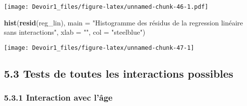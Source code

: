 \documentclass[]{article}
\newenvironment{Shaded}{\begin{snugshade}}{\end{snugshade}}
\newcommand{\KeywordTok}[1]{\textcolor[rgb]{0.13,0.29,0.53}{\textbf{#1}}}
\newcommand{\DataTypeTok}[1]{\textcolor[rgb]{0.13,0.29,0.53}{#1}}
\newcommand{\StringTok}[1]{\textcolor[rgb]{0.31,0.60,0.02}{#1}}
\newcommand{\NormalTok}[1]{#1}
\begin{document}
\texttt{[image: Devoir1\_files/figure-latex/unnamed-chunk-46-1.pdf]}

\begin{Shaded}
\begin{Highlighting}[]
\KeywordTok{hist}\NormalTok{(}\KeywordTok{resid}\NormalTok{(reg_lin), }
     \DataTypeTok{main =} \StringTok{"Histogramme des résidus de la regression linéaire sans interactions"}\NormalTok{, }
     \DataTypeTok{xlab =} \StringTok{""}\NormalTok{, }\DataTypeTok{col =} \StringTok{"steelblue"}\NormalTok{)}
\end{Highlighting}
\end{Shaded}

\texttt{[image: Devoir1\_files/figure-latex/unnamed-chunk-47-1]}

\subsection{5.3 Tests de toutes les interactions
possibles}\label{tests-de-toutes-les-interactions-possibles}

\subsubsection{5.3.1 Interaction avec
l'âge}\label{interaction-avec-luxe2ge}
\end{document}
